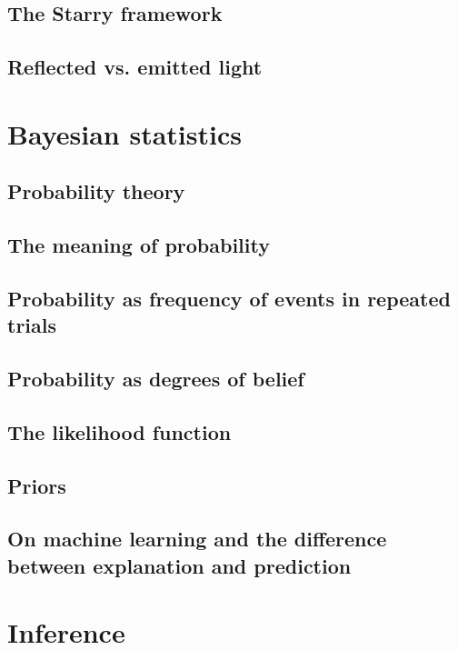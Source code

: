 \documentclass[]{report}
\begin{document}
\subsection{The Starry framework}
\subsection{Reflected vs. emitted light}

\section{Bayesian statistics}
\subsection{Probability theory}
\subsection{The meaning of probability}
\subsection{Probability as frequency of events in repeated trials}
\subsection{Probability as degrees of belief}
\subsection{The likelihood function}
\subsection{Priors}
\subsection{On machine learning and the difference between explanation and prediction}

\section{Inference}
\end{document}
